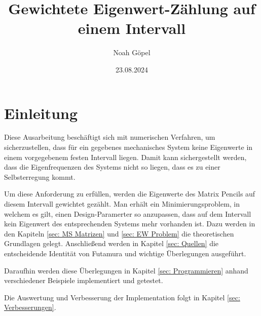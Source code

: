 \documentclass[ngerman,BCOR=4mm]{tudscrreprt}
\theoremstyle{plain} %
\theoremstyle{definition} %
\theoremstyle{remark}
\begin{document}

\date{23.08.2024}
\title{%
      Gewichtete Eigenwert-Zählung auf einem Intervall
}
\subject{bachelor}
\author{%
      Noah Göpel%
}
\maketitle

\clearpage
\tableofcontents
\clearpage
\listofsymbols
\clearpage

\chapter{Einleitung}
\label{sec: Einleitung}
      
      Diese Ausarbeitung beschäftigt sich mit numerischen Verfahren, um sicherzustellen, dass für ein gegebenes mechanisches System keine Eigenwerte in einem vorgegebenem festen Intervall liegen.
      Damit kann sichergestellt werden, dass die Eigenfrequenzen des Systems nicht so liegen, dass es zu einer Selbsterregung kommt.

      Um diese Anforderung zu erfüllen, werden die Eigenwerte des Matrix Pencils auf diesem Intervall gewichtet gezählt. Man erhält ein Minimierungsproblem,
      in welchem es gilt, einen Design-Paramerter so anzupassen, dass auf dem Intervall kein Eigenwert des entsprechenden Systems mehr vorhanden ist.
      Dazu werden in den Kapiteln \ref{sec: MS Matrizen} und \ref{sec: EW Problem} die theoretischen Grundlagen gelegt.
      Anschließend werden in Kapitel \ref{sec: Quellen} die entscheidende Identität von Futamura und wichtige Überlegungen ausgeführt.

      Daraufhin werden diese Überlegungen in Kapitel \ref{sec: Programmieren} anhand verschiedener Beispiele implementiert und getestet.

      Die Auswertung und Verbesserung der Implementation folgt in Kapitel \ref{sec: Verbesserungen}.

\end{document}
